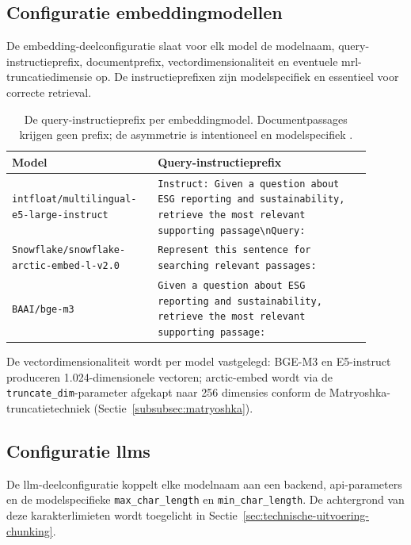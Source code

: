 \subsection{Configuratie embeddingmodellen}

De embedding-deelconfiguratie slaat voor elk model de modelnaam, query-instructieprefix, documentprefix, vectordimensionaliteit en eventuele \gls{mrl}-truncatiedimensie op. De instructieprefixen zijn modelspecifiek en essentieel voor correcte retrieval.

\begin{table}[h]
\centering
\small
\begin{tabular}{p{0.35\linewidth} p{0.55\linewidth}}
\toprule
\textbf{Model} & \textbf{Query-instructieprefix} \\
\midrule
\texttt{intfloat/multilingual-e5-large-instruct}
  & \texttt{Instruct: Given a question about ESG reporting and sustainability, retrieve the most relevant supporting passage\textbackslash nQuery: } \\
\texttt{Snowflake/snowflake-arctic-embed-l-v2.0}
  & \texttt{Represent this sentence for searching relevant passages: } \\
\texttt{BAAI/bge-m3}
  & \texttt{Given a question about ESG reporting and sustainability, retrieve the most relevant supporting passage: } \\
\bottomrule
\end{tabular}
\caption[Instructieprefixen per embeddingmodel]{\label{tab:embedding-prefixes} De query-instructieprefix per embeddingmodel. Documentpassages krijgen geen prefix; de asymmetrie is intentioneel en modelspecifiek \autocite{WangEtAl2022, YuEtAl2024}.}
\end{table}

De vectordimensionaliteit wordt per model vastgelegd: BGE-M3 en E5-instruct produceren 1.024-dimensionele vectoren; arctic-embed wordt via de \texttt{truncate\_dim}-parameter afgekapt naar 256 dimensies conform de Matryoshka-truncatietechniek (Sectie~\ref{subsubsec:matryoshka}).

\subsection{Configuratie \glspl{llm}}

De \gls{llm}-deelconfiguratie koppelt elke modelnaam aan een backend, \gls{api}-parameters en de modelspecifieke \texttt{max\_char\_length} en \texttt{min\_char\_length}. De achtergrond van deze karakterlimieten wordt toegelicht in Sectie~\ref{sec:technische-uitvoering-chunking}.

